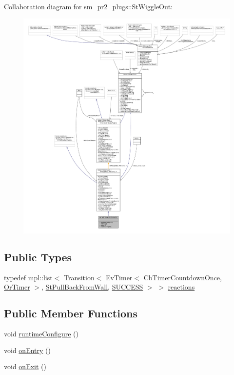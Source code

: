 Collaboration diagram for sm\+\_\+pr2\+\_\+plugs\+:\+:St\+Wiggle\+Out\+:
\nopagebreak
\begin{figure}[H]
\begin{center}
\leavevmode
\includegraphics[width=350pt]{structsm__pr2__plugs_1_1StWiggleOut__coll__graph}
\end{center}
\end{figure}
\subsection*{Public Types}
\begin{DoxyCompactItemize}
\item 
typedef mpl\+::list$<$ Transition$<$ Ev\+Timer$<$ Cb\+Timer\+Countdown\+Once, \hyperlink{classsm__pr2__plugs_1_1OrTimer}{Or\+Timer} $>$, \hyperlink{structsm__pr2__plugs_1_1StPullBackFromWall}{St\+Pull\+Back\+From\+Wall}, \hyperlink{classSUCCESS}{S\+U\+C\+C\+E\+SS} $>$ $>$ \hyperlink{structsm__pr2__plugs_1_1StWiggleOut_a7984b3c4a0d48be520994c08bb97d328}{reactions}
\end{DoxyCompactItemize}
\subsection*{Public Member Functions}
\begin{DoxyCompactItemize}
\item 
void \hyperlink{structsm__pr2__plugs_1_1StWiggleOut_a6fa24859d089ed61fcea478ed3b23cce}{runtime\+Configure} ()
\item 
void \hyperlink{structsm__pr2__plugs_1_1StWiggleOut_a2380c260e5fefee3ca192b4b92102093}{on\+Entry} ()
\item 
void \hyperlink{structsm__pr2__plugs_1_1StWiggleOut_a71b7a3343ff859e7383f9af4e50096c2}{on\+Exit} ()
\end{DoxyCompactItemize}
